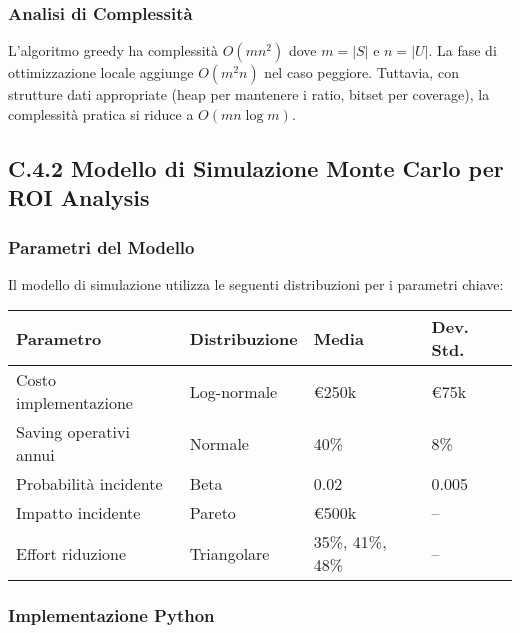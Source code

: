 

\subsubsection{Analisi di Complessità}

L'algoritmo greedy ha complessità $O(mn^2)$ dove $m = |S|$ e $n = |U|$. La fase di ottimizzazione locale aggiunge $O(m^2n)$ nel caso peggiore. Tuttavia, con strutture dati appropriate (heap per mantenere i ratio, bitset per coverage), la complessità pratica si riduce a $O(mn \log m)$.

\subsection{C.4.2 Modello di Simulazione Monte Carlo per ROI Analysis}

\subsubsection{Parametri del Modello}

Il modello di simulazione utilizza le seguenti distribuzioni per i parametri chiave:

\begin{table}[htbp]
\centering
\begin{tabular}{llll}
\toprule
\textbf{Parametro} & \textbf{Distribuzione} & \textbf{Media} & \textbf{Dev. Std.} \\
\midrule
Costo implementazione & Log-normale & €250k & €75k \\
Saving operativi annui & Normale & 40\% & 8\% \\
Probabilità incidente & Beta & 0.02 & 0.005 \\
Impatto incidente & Pareto & €500k & -- \\
Effort riduzione & Triangolare & 35\%, 41\%, 48\% & -- \\
\bottomrule
\end{tabular}
\end{table}

\subsubsection{Implementazione Python}

